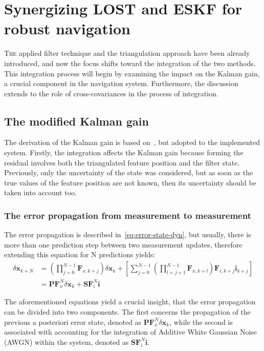 \chapter{Synergizing LOST and ESKF for robust navigation}\label{chap:integration}

\lettrine{T}{he} applied filter technique and the triangulation approach have been already introduced, and now the focus shifts toward the integration of the two methods. This integration process will begin by examining the impact on the Kalman gain, a crucial component in the navigation system. Furthermore, the discussion extends to the role of cross-covariances in the process of integration.

\section{The modified Kalman gain}

The derivation of the Kalman gain is based on~\cite{discrete_kalman_tutorial}, but adopted to the implemented system. Firstly, the integration affects the Kalman gain because forming the residual involves both the triangulated feature position and the filter state. Previously, only the uncertainty of the state was considered, but as soon as the true values of the feature position are not known, then its uncertainty should be taken into account too.

\subsection{The error propagation from measurement to measurement}

The error propagation is described in~\eqref{eq:error-state-dyn}, but usually, there is more than one prediction step between two measurement updates, therefore extending this equation for N predictions yields:
\begin{subequations}
\begin{align}
    \delta\mathbf{x}_{k+N} &= \left(\prod_{j=0}^{N-1}\mathbf{F}_{x,k+j}\right)\delta\mathbf{x}_k + \left[\sum_{j=0}^{N-1}\left(\prod_{l=j+1}^{N-1}\mathbf{F}_{x,k+l} \right) \mathbf{F}_{i,k+j} \mathbf{i}_{k+j}\right] \\ &= \mathbf{PF}_x^N\delta\mathbf{x}_k + \mathbf{SF}_i^N \mathbf{i} 
    \label{eq:true-err-state}
\end{align}
\end{subequations}

The aforementioned equations yield a crucial insight, that the error propagation can be divided into two components. The first concerns the propagation of the previous a posteriori error state, denoted as $\mathbf{PF}_x^N\delta\mathbf{x}_k$, while the second is associated with accounting for the integration of Additive White Gaussian Noise (AWGN) within the system, denoted as $\mathbf{SF}_i^N \mathbf{i}$.

